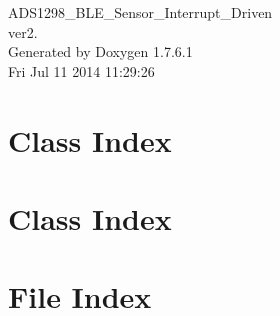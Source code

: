 \documentclass[a4paper]{book}
\begin{document}
\hypersetup{pageanchor=false,citecolor=blue}
\begin{titlepage}
\vspace*{7cm}
\begin{center}
{\Large \-A\-D\-S1298\-\_\-\-B\-L\-E\-\_\-\-Sensor\-\_\-\-Interrupt\-\_\-\-Driven \\[1ex]\large ver2. }\\
\vspace*{1cm}
{\large \-Generated by Doxygen 1.7.6.1}\\
\vspace*{0.5cm}
{\small Fri Jul 11 2014 11:29:26}\\
\end{center}
\end{titlepage}
\clearemptydoublepage
{}
\tableofcontents
\clearemptydoublepage
{}
\hypersetup{pageanchor=true,citecolor=blue}
\chapter{\-Class \-Index}

\chapter{\-Class \-Index}

\chapter{\-File \-Index}

\end{document}
